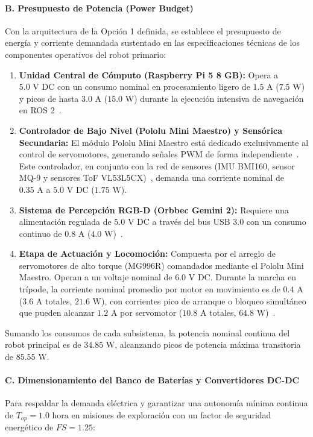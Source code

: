 \paragraph{B. Presupuesto de Potencia (Power Budget)}
Con la arquitectura de la Opción 1 definida, se establece el presupuesto de energía y corriente demandada sustentado en las especificaciones técnicas de los componentes operativos del robot primario:

\begin{enumerate}
    \item \textbf{Unidad Central de Cómputo (Raspberry Pi 5 8 GB):} Opera a $5.0\text{ V DC}$ con un consumo nominal en procesamiento ligero de $1.5\text{ A}$ ($7.5\text{ W}$) y picos de hasta $3.0\text{ A}$ ($15.0\text{ W}$) durante la ejecución intensiva de navegación en ROS 2~\cite{RaspberryPi5_Datasheet}.
    \item \textbf{Controlador de Bajo Nivel (Pololu Mini Maestro) y Sensórica Secundaria:} El módulo Pololu Mini Maestro está dedicado exclusivamente al control de servomotores, generando señales PWM de forma independiente~\cite{Pololu_Maestro_Datasheet}. Este controlador, en conjunto con la red de sensores (IMU BMI160, sensor MQ-9 y sensores ToF VL53L5CX)~\cite{MQ9_Datasheet,VL53L5CX_Datasheet}, demanda una corriente nominal de $0.35\text{ A}$ a $5.0\text{ V DC}$ ($1.75\text{ W}$).
    \item \textbf{Sistema de Percepción RGB-D (Orbbec Gemini 2):} Requiere una alimentación regulada de $5.0\text{ V DC}$ a través del bus USB 3.0 con un consumo continuo de $0.8\text{ A}$ ($4.0\text{ W}$)~\cite{Orbbec_Gemini2_Datasheet}.
    \item \textbf{Etapa de Actuación y Locomoción:} Compuesta por el arreglo de servomotores de alto torque (MG996R) comandados mediante el Pololu Mini Maestro. Operan a un voltaje nominal de $6.0\text{ V DC}$. Durante la marcha en trípode, la corriente nominal promedio por motor en movimiento es de $0.4\text{ A}$ ($3.6\text{ A}$ totales, $21.6\text{ W}$), con corrientes pico de arranque o bloqueo simultáneo que pueden alcanzar $1.2\text{ A}$ por servomotor ($10.8\text{ A}$ totales, $64.8\text{ W}$)~\cite{MG996R_Datasheet}.
\end{enumerate}

Sumando los consumos de cada subsistema, la potencia nominal continua del robot principal es de $34.85\text{ W}$, alcanzando picos de potencia máxima transitoria de $85.55\text{ W}$.

\paragraph{C. Dimensionamiento del Banco de Baterías y Convertidores DC-DC}
Para respaldar la demanda eléctrica y garantizar una autonomía mínima continua de $T_{op} = 1.0\text{ hora}$ en misiones de exploración con un factor de seguridad energético de $FS = 1.25$:

